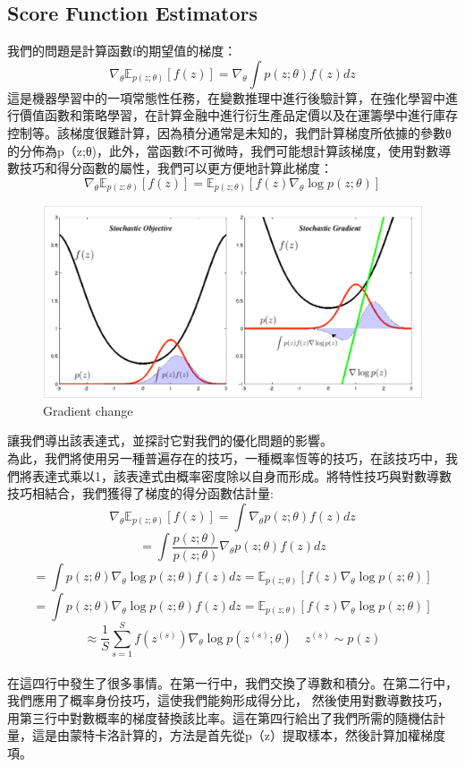\documentclass[14pt,a4paper]{report}  %
\begin{document}
\subsection{Score Function Estimators}
我們的問題是計算函數f的期望值的梯度：\\
$$\nabla_\theta \mathbb{E}_{p(z;\theta)}[f(z)] =\nabla_\theta \int p(z; \theta)f(z) dz$$
 這是機器學習中的一項常態性任務，在變數推理中進行後驗計算，在強化學習中進行價值函數和策略學習，在計算金融中進行衍生產品定價以及在運籌學中進行庫存控制等。該梯度很難計算，因為積分通常是未知的，我們計算梯度所依據的參數θ的分佈為p（z;θ)，此外，當函數f不可微時，我們可能想計算該梯度，使用對數導數技巧和得分函數的屬性，我們可以更方便地計算此梯度：\\
$$\nabla_\theta \mathbb{E}_{p(z;\theta)}[f(z)] = \mathbb{E}_{p(z;\theta)}[f(z)\nabla_\theta \log p(z;\theta)]$$
\begin{figure}[hbt!]
\begin{center}
\includegraphics[scale=0.5]{gradient_change}
\caption{\Large Gradient change}
\label{Gradient change}
\end{center}
\end{figure}
 讓我們導出該表達式，並探討它對我們的優化問題的影響。\\
 為此，我們將使用另一種普遍存在的技巧，一種概率恆等的技巧，在該技巧中，我們將表達式乘以1，該表達式由概率密度除以自身而形成。將特性技巧與對數導數技巧相結合，我們獲得了梯度的得分函數估計量:\\
$$\nabla_\theta \mathbb{E}_{p(z;\theta)}[f(z)]=\int\nabla_\theta p(z;\theta)f(z) dz$$
$$= \int \frac{p(z;\theta)}{p(z;\theta)}\nabla_\theta p(z;\theta)f(z) dz$$
$$=\int p(z;\theta)\nabla_\theta \log p(z;\theta)f(z) dz = \mathbb{E}_{p(z;\theta)}[f(z)\nabla_\theta \log p(z;\theta)]$$
$$=\int p(z;\theta)\nabla_\theta \log p(z;\theta)f(z) dz = \mathbb{E}_{p(z;\theta)}[f(z)\nabla_\theta \log p(z;\theta)]$$
$$\approx \frac{1}{S} \sum_{s=1}^{S}f(z^{(s)})\nabla_\theta \log p(z^{(s)};\theta) \quad z^{(s)}\sim p(z)$$\\
在這四行中發生了很多事情。在第一行中，我們交換了導數和積分。在第二行中，我們應用了概率身份技巧，這使我們能夠形成得分比， 然後使用對數導數技巧，用第三行中對數概率的梯度替換該比率。這在第四行給出了我們所需的隨機估計量，這是由蒙特卡洛計算的，方法是首先從p（z）提取樣本，然後計算加權梯度項。\\
\end{document}
